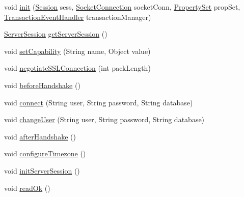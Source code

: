 \begin{DoxyCompactItemize}
\item 
void \mbox{\hyperlink{classcom_1_1mysql_1_1cj_1_1protocol_1_1x_1_1_x_protocol_a4007f4bf0c11af18162121e030183839}{init}} (\mbox{\hyperlink{interfacecom_1_1mysql_1_1cj_1_1_session}{Session}} sess, \mbox{\hyperlink{interfacecom_1_1mysql_1_1cj_1_1protocol_1_1_socket_connection}{Socket\+Connection}} socket\+Conn, \mbox{\hyperlink{interfacecom_1_1mysql_1_1cj_1_1conf_1_1_property_set}{Property\+Set}} prop\+Set, \mbox{\hyperlink{interfacecom_1_1mysql_1_1cj_1_1_transaction_event_handler}{Transaction\+Event\+Handler}} transaction\+Manager)
\item 
\mbox{\hyperlink{interfacecom_1_1mysql_1_1cj_1_1protocol_1_1_server_session}{Server\+Session}} \mbox{\hyperlink{classcom_1_1mysql_1_1cj_1_1protocol_1_1x_1_1_x_protocol_a856b079958623feb6f650c796082839e}{get\+Server\+Session}} ()
\item 
void \mbox{\hyperlink{classcom_1_1mysql_1_1cj_1_1protocol_1_1x_1_1_x_protocol_a4c3435d8052e1759f91e14ae41137e02}{set\+Capability}} (String name, Object value)
\item 
void \mbox{\hyperlink{classcom_1_1mysql_1_1cj_1_1protocol_1_1x_1_1_x_protocol_ae1b4af5ef2c1ef4f6b9edc74095ea43c}{negotiate\+S\+S\+L\+Connection}} (int pack\+Length)
\item 
void \mbox{\hyperlink{classcom_1_1mysql_1_1cj_1_1protocol_1_1x_1_1_x_protocol_a179c06c40d9fa5e7e30d79d9f96961a1}{before\+Handshake}} ()
\item 
void \mbox{\hyperlink{classcom_1_1mysql_1_1cj_1_1protocol_1_1x_1_1_x_protocol_ad9932aa9ac2484e47e8a4d34e3a8d691}{connect}} (String user, String password, String database)
\item 
void \mbox{\hyperlink{classcom_1_1mysql_1_1cj_1_1protocol_1_1x_1_1_x_protocol_ada78c49db272f6f4a680c7d552f5be86}{change\+User}} (String user, String password, String database)
\item 
void \mbox{\hyperlink{classcom_1_1mysql_1_1cj_1_1protocol_1_1x_1_1_x_protocol_aef11da33d3a3b55663631eab148e8018}{after\+Handshake}} ()
\item 
void \mbox{\hyperlink{classcom_1_1mysql_1_1cj_1_1protocol_1_1x_1_1_x_protocol_ac2eba3a8a26e28626fb976d576f89fb7}{configure\+Timezone}} ()
\item 
void \mbox{\hyperlink{classcom_1_1mysql_1_1cj_1_1protocol_1_1x_1_1_x_protocol_ae032f87fdc528d7fd0bfe0f4c7c96767}{init\+Server\+Session}} ()
\item 
void \mbox{\hyperlink{classcom_1_1mysql_1_1cj_1_1protocol_1_1x_1_1_x_protocol_ab79c27fb0d698a01aeed13edeabbb000}{read\+Ok}} ()

\end{DoxyCompactItemize}
